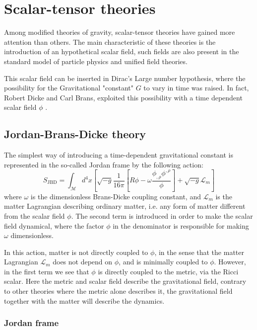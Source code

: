  \chapter{Scalar-tensor theories}

Among modified theories of gravity, scalar-tensor theories have gained more attention than others. 
The main characteristic of these theories is the introduction of an hypothetical scalar field, such fields are also present in the standard model of particle physics and unified field theories.

This scalar field can be inserted in Dirac's Large number hypothesis, where the possibility for the Gravitational "constant" $G$ to vary in time was raised.
In fact, Robert Dicke and Carl Brans, exploited this possibility with a time dependent scalar field $\phi$ \cite{Brans_1961}.

\section{Jordan-Brans-Dicke theory}

The simplest way of introducing a time-dependent gravitational constant is represented in the so-called Jordan frame by the following action:
\begin{equation}
    S_{\text{JBD}}=\int_{\mathcal{M}} d^4x\left[ \sqrt{-g}\frac{1}{16\pi}\left[R\phi-\omega \frac{\phi_{,\rho}\phi^{,\rho}}{\phi}\right]+\sqrt{-g}\mathcal{L}_m\right]
    \label{eqn:BD_action_JF}
\end{equation}
where $\omega$ is the dimensionless Brans-Dicke coupling constant, and $\mathcal{L}_m$ is the matter Lagrangian describing ordinary matter, i.e. any form of matter different from the scalar field $\phi$. The second term is introduced in order to make the scalar field dynamical, where the factor $\phi$ in the denominator is responsible for making $\omega$ dimensionless.

In this action, matter is not directly coupled to $\phi$, in the sense that the matter Lagrangian $\mathcal{L}_m$ does not depend on $\phi$, and is minimally coupled to $\phi$. However, in the first term we see that $\phi$ is directly coupled to the metric, via the Ricci scalar. Here the metric and scalar field describe the gravitational field, contrary to other theories where the metric alone describes it, the gravitational field together with the matter will describe the dynamics. 

\subsection{Jordan frame}


